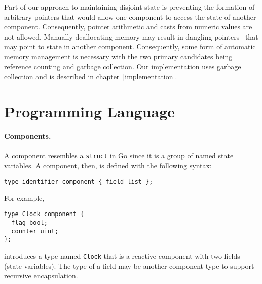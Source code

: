 Part of our approach to maintaining disjoint state is preventing the formation of arbitrary pointers that would allow one component to access the state of another component.
Consequently, pointer arithmetic and casts from numeric values are not allowed.
Manually deallocating memory may result in dangling pointers~\cite{dangle} that may point to state in another component.
Consequently, some form of automatic memory management is necessary with the two primary candidates being reference counting and garbage collection.
Our implementation uses garbage collection and is described in chapter~\ref{implementation}.


\section{Programming Language}

\paragraph{Components.}
A component resembles a \verb+struct+ in Go since it is a group of named state variables.
A component, then, is defined with the following syntax:
\begin{verbatim}
type identifier component { field list };
\end{verbatim}
For example,
\begin{verbatim}
type Clock component {
  flag bool;
  counter uint;
};
\end{verbatim}
introduces a type named \verb+Clock+ that is a reactive component with two fields (state variables).
The type of a field may be another component type to support recursive encapsulation.

